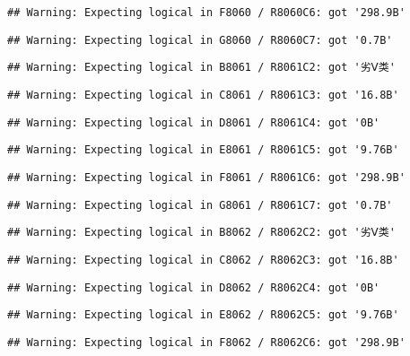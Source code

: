 \documentclass[
]{article}
\begin{document}
\begin{verbatim}
## Warning: Expecting logical in F8060 / R8060C6: got '298.9B'
\end{verbatim}

\begin{verbatim}
## Warning: Expecting logical in G8060 / R8060C7: got '0.7B'
\end{verbatim}

\begin{verbatim}
## Warning: Expecting logical in B8061 / R8061C2: got '劣Ⅴ类'
\end{verbatim}

\begin{verbatim}
## Warning: Expecting logical in C8061 / R8061C3: got '16.8B'
\end{verbatim}

\begin{verbatim}
## Warning: Expecting logical in D8061 / R8061C4: got '0B'
\end{verbatim}

\begin{verbatim}
## Warning: Expecting logical in E8061 / R8061C5: got '9.76B'
\end{verbatim}

\begin{verbatim}
## Warning: Expecting logical in F8061 / R8061C6: got '298.9B'
\end{verbatim}

\begin{verbatim}
## Warning: Expecting logical in G8061 / R8061C7: got '0.7B'
\end{verbatim}

\begin{verbatim}
## Warning: Expecting logical in B8062 / R8062C2: got '劣Ⅴ类'
\end{verbatim}

\begin{verbatim}
## Warning: Expecting logical in C8062 / R8062C3: got '16.8B'
\end{verbatim}

\begin{verbatim}
## Warning: Expecting logical in D8062 / R8062C4: got '0B'
\end{verbatim}

\begin{verbatim}
## Warning: Expecting logical in E8062 / R8062C5: got '9.76B'
\end{verbatim}

\begin{verbatim}
## Warning: Expecting logical in F8062 / R8062C6: got '298.9B'
\end{verbatim}
\end{document}
